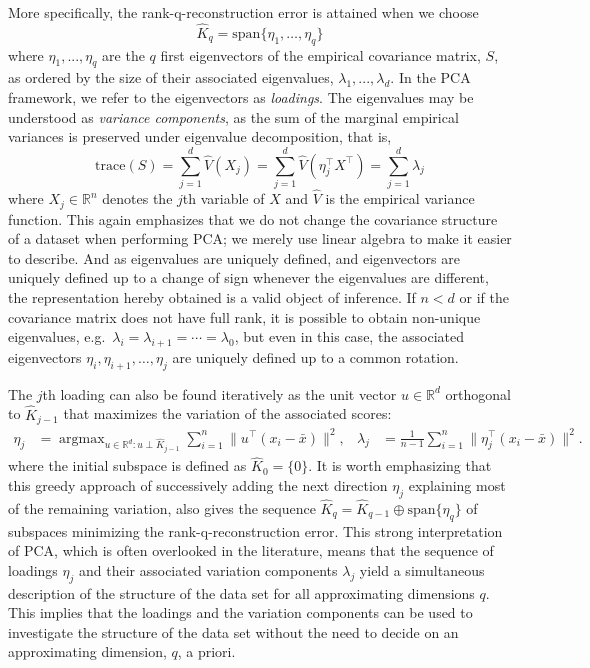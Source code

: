\documentclass[titlepage,11pt,twoside]{article}
\newcommand{\RR}{\mathbb{R}}
\DeclareMathOperator*{\argmax}{argmax}
\begin{document}
More specifically, the rank-q-reconstruction error is attained when we choose
\begin{equation*}
\hat{K}_q = \text{span}\{\eta_1,\dotsc,\eta_q\}
\end{equation*}
where $\eta_1, ..., \eta_q$ are the $q$ first eigenvectors of the empirical covariance matrix, $S$, as ordered by the size of their associated eigenvalues, $\lambda_1, ..., \lambda_d$. In the PCA framework, we refer to the eigenvectors as \textit{loadings}. The eigenvalues may be understood as \textit{variance components}, as the sum of the marginal empirical variances is preserved under eigenvalue decomposition, that is,
$$\text{trace}(S) = \sum_{j=1}^d \hat{V}(X_j) = \sum_{j=1}^d \hat{V}(\eta_j^\top X^\top) = \sum_{j=1}^d \lambda_j$$
where $X_j \in \RR^n$ denotes the $j$th variable of $X$ and $\hat{V}$ is the empirical variance function. This again emphasizes that we do not change the covariance structure of a dataset when performing PCA; we merely use linear algebra to make it easier to describe. And as eigenvalues are uniquely defined, and eigenvectors are uniquely defined up to a change of sign whenever the eigenvalues are different, the representation hereby obtained is a valid object of inference. If $n < d$ or if the covariance matrix does not have full rank, it is possible to obtain non-unique eigenvalues, e.g.\ $\lambda_i=\lambda_{i+1}=\dotsm=\lambda_0$, but even in this case, the associated eigenvectors $\eta_i,\eta_{i+1},\dotsc,\eta_j$ are uniquely defined up to a common rotation. 

The $j$th loading can also be found iteratively as the unit vector $u \in \RR^d$ orthogonal to $\hat{K}_{j-1}$ that maximizes the variation of the associated scores:
\begin{align*}
\eta_j &= \argmax_{u \in \RR^d\colon u \perp \hat{K}_{j-1}} \sum_{i=1}^n \lVert u^\top (x_i - \bar{x}) \rVert^2, &
\lambda_j &= \frac{1}{n-1} \sum_{i=1}^n \lVert \eta_j^\top (x_i - \bar{x}) \rVert^2.
\end{align*}
where the initial subspace is defined as $\hat{K}_0 = \{0\}$. It is worth emphasizing that this greedy approach of successively adding the next direction $\eta_j$ explaining most of the remaining variation, also gives the sequence $\hat{K}_q = \hat{K}_{q-1} \oplus \text{span} \{\eta_q\}$ of subspaces minimizing the rank-q-reconstruction error. This strong interpretation of PCA, which is often overlooked in the literature, means that the sequence of loadings $\eta_j$ and their associated variation components $\lambda_j$ yield a simultaneous description of the structure of the data set for all approximating dimensions $q$. This implies that the loadings and the variation components can be used to investigate the structure of the data set without the need to decide on an approximating dimension, $q$, a priori.
\end{document}
